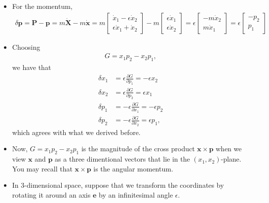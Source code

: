 \documentclass[10pt]{article}
\newcommand{\ve}[1]{\mathbf{#1}}
\begin{document}
\begin{itemize}
    \item For the momentum,
    \begin{align*}
      \delta \ve{p} 
      = \ve{P} - \ve{p} 
      = m \dot{\ve{X}} - m\dot{\ve{x}}
      = m \begin{bmatrix}
        \dot{x}_1 - \epsilon \dot{x}_2 \\
        \epsilon \dot{x}_1 + \dot{x}_2 
      \end{bmatrix}
      - m \begin{bmatrix}
        \epsilon \dot{x}_1 \\
        \epsilon \dot{x}_2
      \end{bmatrix}
      = \epsilon \begin{bmatrix}
        -m \dot{x}_2 \\
        m \dot{x}_1
      \end{bmatrix}
      = \epsilon \begin{bmatrix}
        -p_2 \\ p_1
      \end{bmatrix}
    \end{align*}

    \item Choosing
    \begin{align*}
      G = x_1 p_2 - x_2 p_1,
    \end{align*}
    we have that
    \begin{align*}
      \delta x_1 &= \epsilon \frac{\partial G}{\partial p_1} = -\epsilon x_2 \\
      \delta x_2 &= \epsilon \frac{\partial G}{\partial p_2} =  \epsilon x_1 \\
      \delta p_1 &= -\epsilon \frac{\partial G}{\partial x_1} =- \epsilon p_2 \\
      \delta p_2 &= -\epsilon \frac{\partial G}{\partial x_2} = \epsilon p_1,
    \end{align*}
    which agrees with what we derived before.

    \item Now, $G = x_1 p_2 - x_2 p_1$ is the magnitude of the cross product $\ve{x} \times \ve{p}$ when we view $\ve{x}$ and $\ve{p}$ as a three dimentional vectors that lie in the $(x_1, x_2)$-plane. You may recall that $\ve{x} \times \ve{p}$ is the angular momentum.

    \item In 3-dimensional space, suppose that we transform the coordinates by rotating it around an axis $\ve{e}$ by an infinitesimal angle $\epsilon$.


\end{itemize}
\end{document}
